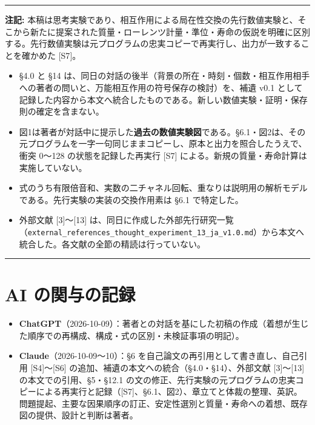 \documentclass[
  a4paper,
]{ltjsarticle}
\providecommand{\tightlist}{%
  \setlength{\itemsep}{0pt}\setlength{\parskip}{0pt}}
\begin{document}
\begin{center}\rule{0.5\linewidth}{0.5pt}\end{center}

\textbf{注記:}
本稿は思考実験であり、相互作用による局在性交換の先行数値実験と、そこから新たに提案された質量・ローレンツ計量・準位・寿命の仮説を明確に区別する。先行数値実験は元プログラムの忠実コピーで再実行し、出力が一致することを確かめた
{[}S7{]}。

\begin{itemize}
\tightlist
\item
  §4.0 と §14
  は、同日の対話の後半（背景の所在・時刻・個数・相互作用相手への著者の問いと、万能相互作用の符号保存の検討）を、補遺
  v0.1
  として記録した内容から本文へ統合したものである。新しい数値実験・証明・保存則の確定を含まない。
\item
  図1は著者が対話中に提示した\textbf{過去の数値実験図}である。§6.1・図2は、その元プログラムを一字一句同じままコピーし、原本と出力を照合したうえで、衝突
  0〜128 の状態を記録した再実行 {[}S7{]}
  による。新規の質量・寿命計算は実施していない。
\item
  式のうち有限倍音和、実数の二チャネル回転、重なりは説明用の解析モデルである。先行実験の実装の交換作用素は
  §6.1 で特定した。
\item
  外部文献 {[}3{]}〜{[}13{]}
  は、同日に作成した外部先行研究一覧（\texttt{external\_\allowbreak{}references\_\allowbreak{}thought\_\allowbreak{}experiment\_\allowbreak{}13\_\allowbreak{}ja\_\allowbreak{}v1.0.md}）から本文へ統合した。各文献の全節の精読は行っていない。
\end{itemize}

\begin{center}\rule{0.5\linewidth}{0.5pt}\end{center}

\section{AI の関与の記録}\label{ai-ux306eux95a2ux4e0eux306eux8a18ux9332}

\begin{itemize}
\tightlist
\item
  \textbf{ChatGPT}（2026-10-09）：著者との対話を基にした初稿の作成（着想が生じた順序での再構成、構成・式の区別・未検証事項の明記）。
\item
  \textbf{Claude}（2026-10-09〜10）：§6
  を自己論文の再引用として書き直し、自己引用 {[}S4{]}〜{[}S6{]}
  の追加、補遺の本文への統合（§4.0・§14）、外部文献 {[}3{]}〜{[}13{]}
  の本文での引用、§5・§12.1
  の文の修正、先行実験の元プログラムの忠実コピーによる再実行と記録（{[}S7{]}、§6.1、図2）、章立てと体裁の整理、英訳。問題提起、主要な因果順序の訂正、安定性選別と質量・寿命への着想、既存図の提供、設計と判断は著者。
\end{itemize}
\end{document}
